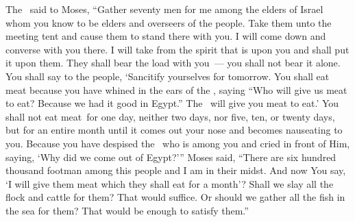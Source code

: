 \begin{inparaenum}
   The \lord\ said to Moses, ``Gather seventy men for me among the elders of Israel whom you know to be elders and overseers of the people. Take them unto the meeting tent and cause them to stand there with you.%
   I will come down and converse with you there. I will take from the spirit that is upon you and shall put it upon them. They shall bear the load with you~--- you shall not bear it alone.%
   You shall say to the people, `Sancitify yourselves for tomorrow. You shall eat meat because you have whined in the ears of the \lord, saying ``Who will give us meat to eat? Because we had it good in Egypt.'' The \lord\ will give you meat to eat.'%
   You shall not eat meat\understood\ for one day, neither two days, nor five, ten, or twenty days,%
   but for an entire month until it comes out your nose and becomes nauseating to you. Because you have despised the \lord\ who is among you and cried in front of Him, saying, `Why did we come out of Egypt?'\thinspace''%
   Moses said, ``There are six hundred thousand footman among this people and I am in their midst. And now You say, `I will give them meat which they shall eat for a month'?%
   Shall we slay all the flock and cattle for them? That would suffice. Or should we gather all the fish in the sea for them? That would be enough to satisfy them.''%
  

\end{inparaenum}
